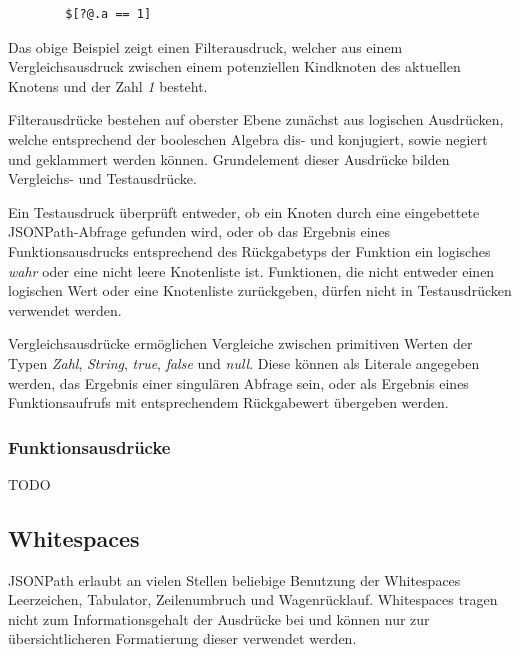 \documentclass[oneside]{ausarbeitung}
\begin{document}
	\begin{lstlisting}
		$[?@.a == 1]
	\end{lstlisting}
	
	Das obige Beispiel zeigt einen Filterausdruck, welcher aus einem Vergleichsausdruck zwischen einem potenziellen Kindknoten des aktuellen Knotens und der Zahl \textit{1} besteht.
	
	 Filterausdrücke bestehen auf oberster Ebene zunächst aus logischen Ausdrücken, welche entsprechend der booleschen Algebra dis- und konjugiert, sowie negiert und geklammert werden können. Grundelement dieser Ausdrücke bilden Vergleichs- und Testausdrücke.
	
	Ein Testausdruck überprüft entweder, ob ein Knoten durch eine eingebettete JSONPath-Abfrage gefunden wird, oder ob das Ergebnis eines Funktionsausdrucks entsprechend des Rückgabetyps der Funktion ein logisches \textit{wahr} oder eine nicht leere Knotenliste ist. Funktionen, die nicht entweder einen logischen Wert oder eine Knotenliste zurückgeben, dürfen nicht in Testausdrücken verwendet werden.
	
	Vergleichsausdrücke ermöglichen Vergleiche zwischen primitiven Werten der Typen \textit{Zahl}, \textit{String}, \textit{true}, \textit{false} und \textit{null}. Diese können als Literale angegeben werden, das Ergebnis einer singulären Abfrage sein, oder als Ergebnis eines Funktionsaufrufs mit entsprechendem Rückgabewert übergeben werden.
	
	\subsubsection{Funktionsausdrücke}
	
	TODO
	
		

	
	
	
	
	
	
	
	
	
	
	\subsection{Whitespaces}
	
	JSONPath erlaubt an vielen Stellen beliebige Benutzung der Whitespaces Leerzeichen, Tabulator, Zeilenumbruch und Wagenrücklauf. Whitespaces tragen nicht zum Informationsgehalt der Ausdrücke bei und können nur zur übersichtlicheren Formatierung dieser verwendet werden. 
	
\end{document}
